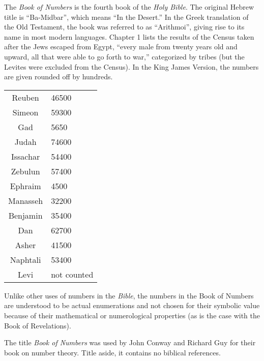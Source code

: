 \documentclass[12pt]{article}
\begin{document}
The {\em Book of Numbers} is the fourth book of the {\it Holy Bible}. The original Hebrew title is ``Ba-Midbar'', which means ``In the Desert.'' In the Greek translation of the Old Testament, the book was referred to as ``Arithmoi'', giving rise to its name in most modern languages. Chapter 1 lists the results of the Census taken after the Jews escaped from Egypt, ``every male from twenty years old and upward, all that were able to go forth to war,'' categorized by tribes (but the Levites were excluded from the Census). In the King James Version, the numbers are given rounded off by hundreds.

\begin{tabular}{|c|l|}
Reuben & 46500 \\
Simeon & 59300 \\
Gad & 5650 \\
Judah & 74600 \\
Issachar & 54400 \\
Zebulun & 57400 \\
Ephraim & 4500 \\
Manasseh & 32200 \\
Benjamin & 35400 \\
Dan & 62700 \\
Asher & 41500 \\
Naphtali & 53400 \\
Levi & not counted \\
\end{tabular}

Unlike other uses of numbers in the {\it Bible}, the numbers in the Book of Numbers are understood to be actual enumerations and not chosen for their symbolic value because of their mathematical or numerological properties (as is the case with the Book of Revelations).

The title {\it Book of Numbers} was used by John Conway and Richard Guy for their book on number theory. Title aside, it contains no biblical references.
\end{document}
